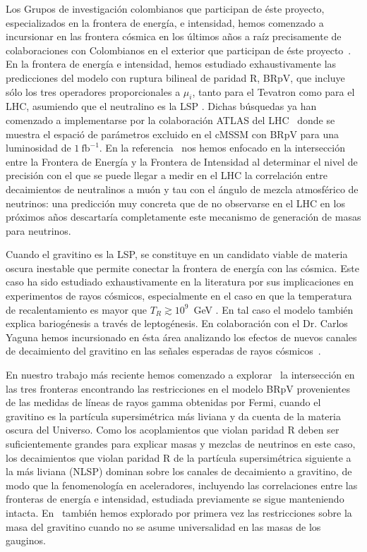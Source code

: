 Los Grupos de investigación colombianos que participan de éste
proyecto, especializados en la frontera de energía, e intensidad,
hemos comenzado a incursionar en las frontera cósmica en los últimos
años a raíz precisamente de colaboraciones con Colombianos en el
exterior que participan de éste
proyecto~\cite{Sierra:2008wj,Sierra:2009zq,Choi:2010jt}. En la
frontera de energía e intensidad, hemos estudiado exhaustivamente las
predicciones del modelo con ruptura bilineal de paridad R, BRpV, que
incluye sólo los tres operadores proporcionales a $\mu_i$, tanto para
el Tevatron como para el LHC, asumiendo que el neutralino es la
LSP
\cite{Magro:2003zb,deCampos:2005ri,deCampos:2007bn,deCampos:2008ic,deCampos:2008re,DeCampos:2010yu}. Dichas
búsquedas ya han comenzado a implementarse por la colaboración ATLAS
del LHC~\cite{:2011iu} donde se muestra el espació de parámetros
excluido en el cMSSM con BRpV para una luminosidad de $1\
\text{fb}^{-1}$.  En la referencia~\cite{DeCampos:2010yu} nos hemos
enfocado en la intersección entre la Frontera de Energía y la Frontera
de Intensidad al determinar el nivel de precisión con el que se puede
llegar a medir en el LHC la correlación entre decaimientos de
neutralinos a muón y tau con el ángulo de mezcla atmosférico de
neutrinos: una predicción muy concreta que de no observarse en el LHC
en los próximos años descartaría completamente este mecanismo de
generación de masas para neutrinos.

Cuando el gravitino es la LSP, se constituye en un candidato viable de
materia oscura inestable que permite conectar la frontera de energía
con las cósmica. Este caso ha sido estudiado exhaustivamente en la
literatura por sus implicaciones en experimentos de rayos cósmicos,
especialmente en el caso en que la temperatura de recalentamiento es
mayor que $T_R\gtrsim 10^9$~GeV
\cite{Takayama:2000uz,Buchmuller:2007ui,Bertone:2007aw,Ibarra:2007wg,Ishiwata:2008cu,Covi:2008jy,Ibarra:2008qg}.
En tal caso el modelo también explica bariogénesis a través de
leptogénesis. En colaboración con el Dr. Carlos Yaguna hemos
incursionado en ésta área analizando los efectos de nuevos canales de
decaimiento del gravitino en las señales esperadas de rayos
cósmicos~\cite{Choi:2010jt}.

En nuestro trabajo más reciente hemos comenzado a
explorar~\cite{Restrepo:2011rj} la intersección en las tres fronteras
encontrando las restricciones en el modelo BRpV provenientes de las
medidas de líneas de rayos gamma obtenidas por Fermi, cuando el
gravitino es la partícula supersimétrica más liviana y da cuenta de la
materia oscura del Universo. Como los acoplamientos que violan paridad
R deben ser suficientemente grandes para explicar masas y mezclas de
neutrinos en este caso, los decaimientos que violan paridad R de la
partícula supersimétrica siguiente a la más liviana (NLSP) dominan
sobre los canales de decaimiento a gravitino, de modo que la
fenomenología en aceleradores, incluyendo las correlaciones entre las
fronteras de energía e intensidad, estudiada previamente se sigue
manteniendo intacta. En~\cite{Restrepo:2011rj} también hemos explorado
por primera vez las restricciones sobre la masa del gravitino cuando
no se asume universalidad en las masas de los gauginos.

